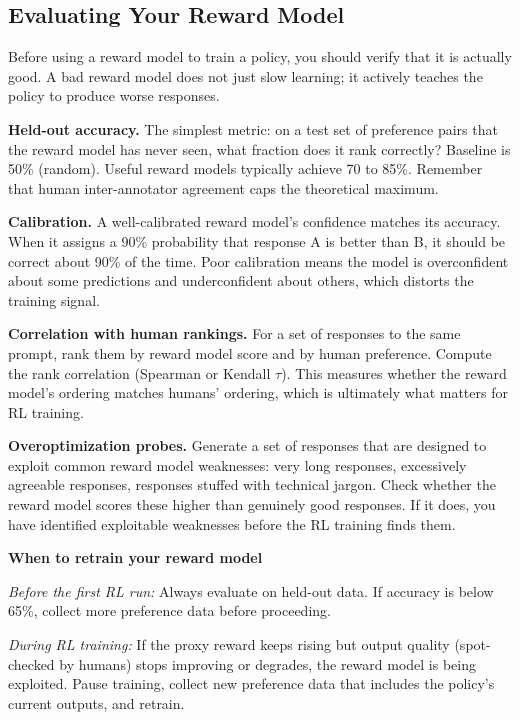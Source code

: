 \begin{chapterenv}
\section{Evaluating Your Reward Model}

Before using a reward model to train a policy, you should verify that it is actually good. A bad reward model does not just slow learning; it actively teaches the policy to produce worse responses.

\textbf{Held-out accuracy.} The simplest metric: on a test set of preference pairs that the reward model has never seen, what fraction does it rank correctly? Baseline is 50\% (random). Useful reward models typically achieve 70 to 85\%. Remember that human inter-annotator agreement caps the theoretical maximum.

\textbf{Calibration.} A well-calibrated reward model's confidence matches its accuracy. When it assigns a 90\% probability that response A is better than B, it should be correct about 90\% of the time. Poor calibration means the model is overconfident about some predictions and underconfident about others, which distorts the training signal.

\textbf{Correlation with human rankings.} For a set of responses to the same prompt, rank them by reward model score and by human preference. Compute the rank correlation (Spearman or Kendall $\tau$). This measures whether the reward model's ordering matches humans' ordering, which is ultimately what matters for RL training.

\textbf{Overoptimization probes.} Generate a set of responses that are designed to exploit common reward model weaknesses: very long responses, excessively agreeable responses, responses stuffed with technical jargon. Check whether the reward model scores these higher than genuinely good responses. If it does, you have identified exploitable weaknesses before the RL training finds them.

\begin{infobox}
\textbf{When to retrain your reward model}

\textit{Before the first RL run:} Always evaluate on held-out data. If accuracy is below 65\%, collect more preference data before proceeding.

\textit{During RL training:} If the proxy reward keeps rising but output quality (spot-checked by humans) stops improving or degrades, the reward model is being exploited. Pause training, collect new preference data that includes the policy's current outputs, and retrain.


\end{infobox}
\end{chapterenv}
